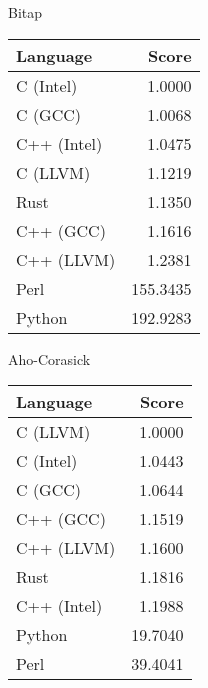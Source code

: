 \begin{subtable}{0.33\textwidth}
    \centering
    \caption{Bitap}
    \label{table:runtime:shift_or}
    \begin{tabular}{|l|r|}
        \hline
        Language & Score \\
        \hline
        C (Intel) & 1.0000 \\
        C (GCC) & 1.0068 \\
        C++ (Intel) & 1.0475 \\
        C (LLVM) & 1.1219 \\
        Rust & 1.1350 \\
        C++ (GCC) & 1.1616 \\
        C++ (LLVM) & 1.2381 \\
        Perl & 155.3435 \\
        Python & 192.9283 \\
        \hline
    \end{tabular}
\end{subtable}
\begin{subtable}{0.33\textwidth}
    \centering
    \caption{Aho-Corasick}
    \label{table:runtime:aho_corasick}
    \begin{tabular}{|l|r|}
        \hline
        Language & Score \\
        \hline
        C (LLVM) & 1.0000 \\
        C (Intel) & 1.0443 \\
        C (GCC) & 1.0644 \\
        C++ (GCC) & 1.1519 \\
        C++ (LLVM) & 1.1600 \\
        Rust & 1.1816 \\
        C++ (Intel) & 1.1988 \\
        Python & 19.7040 \\
        Perl & 39.4041 \\
        \hline
    \end{tabular}
\end{subtable}%

